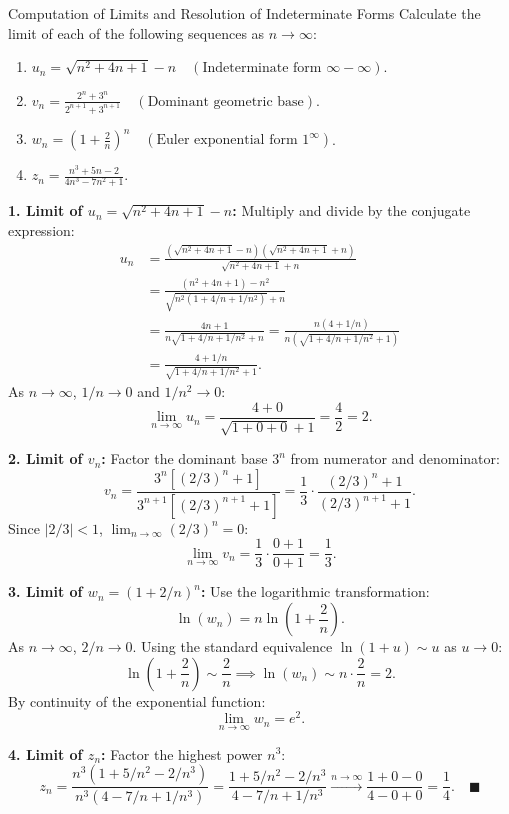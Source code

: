 \begin{exercise}{Computation of Limits and Resolution of Indeterminate Forms}
Calculate the limit of each of the following sequences as $n \to \infty$:
\begin{enumerate}[leftmargin=1.5em,itemsep=2pt]
  \item $u_n = \sqrt{n^2 + 4n + 1} - n \quad (\text{Indeterminate form } \infty - \infty)$.
  \item $v_n = \frac{2^n + 3^n}{2^{n+1} + 3^{n+1}} \quad (\text{Dominant geometric base})$.
  \item $w_n = \left( 1 + \frac{2}{n} \right)^n \quad (\text{Euler exponential form } 1^\infty)$.
  \item $z_n = \frac{n^3 + 5n - 2}{4n^3 - 7n^2 + 1}$.
\end{enumerate}
\end{exercise}

\begin{tabletworkspace}[5.0cm]
\end{tabletworkspace}

\begin{solution}
\textbf{1. Limit of $u_n = \sqrt{n^2 + 4n + 1} - n$:}
Multiply and divide by the conjugate expression:
\begin{align*}
u_n &= \frac{(\sqrt{n^2 + 4n + 1} - n)(\sqrt{n^2 + 4n + 1} + n)}{\sqrt{n^2 + 4n + 1} + n} \\
&= \frac{(n^2 + 4n + 1) - n^2}{\sqrt{n^2(1 + 4/n + 1/n^2)} + n} \\
&= \frac{4n + 1}{n\sqrt{1 + 4/n + 1/n^2} + n} = \frac{n(4 + 1/n)}{n(\sqrt{1 + 4/n + 1/n^2} + 1)} \\
&= \frac{4 + 1/n}{\sqrt{1 + 4/n + 1/n^2} + 1}.
\end{align*}
As $n \to \infty$, $1/n \to 0$ and $1/n^2 \to 0$:
\[
\lim_{n \to \infty} u_n = \frac{4 + 0}{\sqrt{1 + 0 + 0} + 1} = \frac{4}{2} = 2.
\]

\textbf{2. Limit of $v_n$:}
Factor the dominant base $3^n$ from numerator and denominator:
\[
v_n = \frac{3^n \left[ (2/3)^n + 1 \right]}{3^{n+1} \left[ (2/3)^{n+1} + 1 \right]} = \frac{1}{3} \cdot \frac{(2/3)^n + 1}{(2/3)^{n+1} + 1}.
\]
Since $|2/3| < 1$, $\lim_{n \to \infty} (2/3)^n = 0$:
\[
\lim_{n \to \infty} v_n = \frac{1}{3} \cdot \frac{0 + 1}{0 + 1} = \frac{1}{3}.
\]

\textbf{3. Limit of $w_n = (1 + 2/n)^n$:}
Use the logarithmic transformation:
\[
\ln(w_n) = n \ln\left(1 + \frac{2}{n}\right).
\]
As $n \to \infty$, $2/n \to 0$. Using the standard equivalence $\ln(1 + u) \sim u$ as $u \to 0$:
\[
\ln\left(1 + \frac{2}{n}\right) \sim \frac{2}{n} \implies \ln(w_n) \sim n \cdot \frac{2}{n} = 2.
\]
By continuity of the exponential function:
\[
\lim_{n \to \infty} w_n = e^2.
\]

\textbf{4. Limit of $z_n$:}
Factor the highest power $n^3$:
\[
z_n = \frac{n^3(1 + 5/n^2 - 2/n^3)}{n^3(4 - 7/n + 1/n^3)} = \frac{1 + 5/n^2 - 2/n^3}{4 - 7/n + 1/n^3} \xrightarrow{n \to \infty} \frac{1 + 0 - 0}{4 - 0 + 0} = \frac{1}{4}. \quad \blacksquare
\]
\end{solution}

